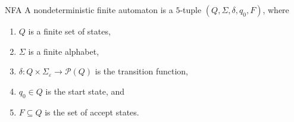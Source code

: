 \begin{Definition}{NFA}{}
	A nondeterministic finite automaton is a $5$-tuple $\left(Q, \Sigma, \delta, q_0, F\right)$, where
	\begin{enumerate}
		\item $Q$ is a finite set of states,
		\item $\Sigma$ is a finite alphabet,
		\item $\delta: Q \times \Sigma_{\varepsilon} \longrightarrow \mathcal{P}(Q)$ is the transition function,
		\item $q_0 \in Q$ is the start state, and
		\item $F \subseteq Q$ is the set of accept states.
	\end{enumerate}
\end{Definition}